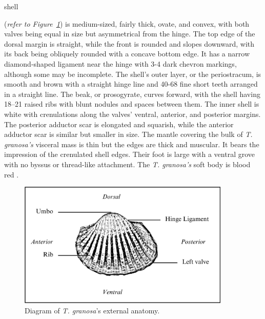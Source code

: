 \textit{\Tgranosa} shell {(\textit{refer to Figure~\ref{fig:anatomy}}) is medium-sized, fairly thick, ovate, and convex, with both valves being equal in size but asymmetrical from the hinge. The top edge of the dorsal margin is straight, while the front is rounded and slopes downward, with its back being obliquely rounded with a concave bottom edge. It has a narrow diamond-shaped ligament near the hinge with 3-4 dark chevron markings, although some may be incomplete. The shell’s outer layer, or the periostracum, is smooth and brown with a straight hinge line and 40-68 fine short teeth arranged in a straight line. The beak, or prosogyrate, curves forward, with the shell having 18–21 raised ribs with blunt nodules and spaces between them. The inner shell is white with crenulations along the valves' ventral, anterior, and posterior margins. The posterior adductor scar is elongated and squarish, while the anterior adductor scar is similar but smaller in size. The mantle covering the bulk of \textit{T. granosa’s} visceral mass is thin but the edges are thick and muscular. It bears the impression of the crenulated shell edges. Their foot is large with a ventral grove with no byssus or thread-like attachment. The  \textit{T. granosa’s} soft body is blood red \cite{narasimham1988}.  

\begin{figure}[!htbp]
	\centering
	\includegraphics[width=0.9\textwidth]{figures/anatomy.png}
	\caption{Diagram of \textit{T. granosa}'s external anatomy.}
	\label{fig:anatomy}
\end{figure}

}
